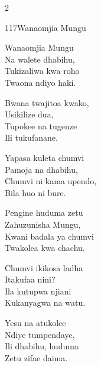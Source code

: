 \documentclass{article}
\begin{document}
\begin{multicols}{2}
\begin{hymn}{117}{Wanaomjia Mungu}{}
\begin{stanza}
Wanaomjia Mungu\\
Na walete dhabihu,\\
Tukizaliwa kwa roho\\
Twaona ndiyo haki.
\end{stanza}
\begin{chorus}
Bwana twajitoa kwako,\\
Usikilize dua,\\
Tupokee na tugeuze\\
Ili tukufanane.
\end{chorus}
\begin{stanza}
Yapasa kuleta chumvi\\
Pamoja na dhabihu,\\
Chumvi ni kama upendo,\\
Bila huo ni bure.
\end{stanza}
\begin{stanza}
Pengine huduma zetu\\
Zahuzunisha Mungu,\\
Kwani badala ya chumvi\\
Twakolea kwa chachu.
\end{stanza}
\begin{stanza}
Chumvi ikikosa ladha\\
Itakufaa nini?\\
Ila kutupwa njiani\\
Kukanyagwa na watu.
\end{stanza}
\begin{stanza}
Yesu na atukolee\\
Ndiye tumpendaye,\\
Ili dhabihu, huduma\\
Zetu zifae daima.
\end{stanza}
\end{hymn}


\end{multicols}
\end{document}
